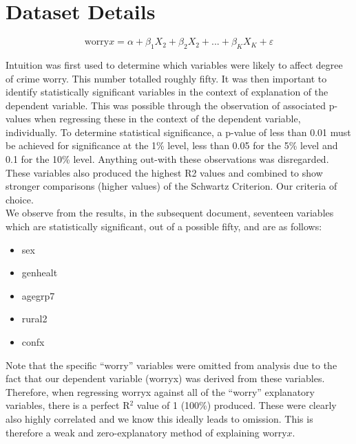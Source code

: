 \documentclass[11pt, english]{article}
\begin{document}
\newpage

\section{Dataset Details}

	$$\mathrm{worry}x=\alpha+\beta_1X_2+\beta_2X_2+...+\beta_KX_K+\varepsilon$$

	Intuition was first used to determine which variables were likely to affect degree of crime worry. This number totalled roughly fifty. It was then important to identify statistically significant variables in the context of explanation of the dependent variable. This was possible through the observation of associated p-values when regressing these in the context of the dependent variable, individually. To determine statistical significance, a p-value of less than 0.01 must be achieved for significance at the 1\% level, less than 0.05 for the 5\% level and 0.1 for the 10\% level. Anything out-with these observations was disregarded. These variables also produced the highest R2 values and combined to show stronger comparisons (higher values) of the Schwartz Criterion. Our criteria of choice.\\

	We observe from the results, in the subsequent document, seventeen variables which are statistically significant, out of a possible fifty, and are as follows:

	\begin{itemize}
	\setlength\itemsep{0cm}
		\item sex
		\item genhealt
		\item agegrp7
		\item rural2
		\item confx
	\end{itemize}

	Note that the specific ``worry'' variables were omitted from analysis due to the fact that our dependent variable (worryx) was derived from these variables. Therefore, when regressing worryx against all of the ``worry'' explanatory variables, there is a perfect R$^2$ value of 1 (100\%) produced. These were clearly also highly correlated and we know this ideally leads to omission. This is therefore a weak and zero-explanatory method of explaining worry$x$.\\
\end{document}
